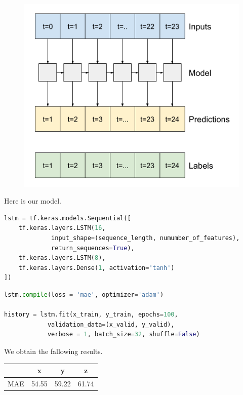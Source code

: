 \begin{figure}[H]
\centering
  \includegraphics[scale=0.35]{img/task_1/fig2.png}
  \label{fig: }
\end{figure}


Here is our model.

\begin{lstlisting}[language=Python]
lstm = tf.keras.models.Sequential([
	tf.keras.layers.LSTM(16, 
		     input_shape=(sequence_length, numumber_of_features), 
		     return_sequences=True),
	tf.keras.layers.LSTM(8),
	tf.keras.layers.Dense(1, activation='tanh')
])
\end{lstlisting}

\begin{lstlisting}[language=Python]
lstm.compile(loss = 'mae', optimizer='adam')

history = lstm.fit(x_train, y_train, epochs=100, 
			validation_data=(x_valid, y_valid), 
			verbose = 1, batch_size=32, shuffle=False)
\end{lstlisting}

We obtain the fallowing results.

\begin{center}
\begin{tabular}{| c | c | c | c |} 
\hline
 & x & y & z  \\ [0.5ex] 
\hline
\hline
MAE & 54.55 & 59.22 & 61.74 \\
\hline
\end{tabular}
\end{center}


